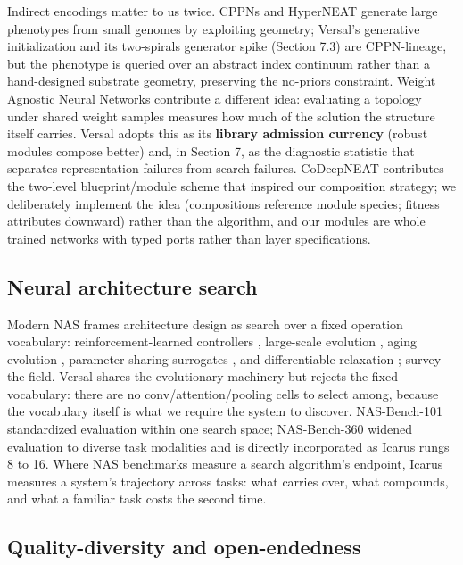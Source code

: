\documentclass[11pt]{article}
\begin{document}
Indirect encodings matter to us twice. CPPNs \citep{stanley2007} and HyperNEAT \citep{stanley2009, risi2012} generate large phenotypes from small genomes by exploiting geometry; Versal's generative initialization and its two-spirals generator spike (Section 7.3) are CPPN-lineage, but the phenotype is queried over an abstract index continuum rather than a hand-designed substrate geometry, preserving the no-priors constraint. Weight Agnostic Neural Networks \citep{gaier2019} contribute a different idea: evaluating a topology under shared weight samples measures how much of the solution the structure itself carries. Versal adopts this as its \textbf{library admission currency} (robust modules compose better) and, in Section 7, as the diagnostic statistic that separates representation failures from search failures. CoDeepNEAT \citep{miikkulainen2017} contributes the two-level blueprint/module scheme that inspired our composition strategy; we deliberately implement the idea (compositions reference module species; fitness attributes downward) rather than the algorithm, and our modules are whole trained networks with typed ports rather than layer specifications.

\subsection{Neural architecture search}

Modern NAS frames architecture design as search over a fixed operation vocabulary: reinforcement-learned controllers \citep{zoph2017}, large-scale evolution \citep{real2017}, aging evolution \citep{real2019}, parameter-sharing surrogates \citep{pham2018}, and differentiable relaxation \citep{liu2019}; \citet{elsken2019b} survey the field. Versal shares the evolutionary machinery but rejects the fixed vocabulary: there are no conv/attention/pooling cells to select among, because the vocabulary itself is what we require the system to discover. NAS-Bench-101 \citep{ying2019} standardized evaluation within one search space; NAS-Bench-360 \citep{tu2022} widened evaluation to diverse task modalities and is directly incorporated as Icarus rungs 8 to 16. Where NAS benchmarks measure a search algorithm's endpoint, Icarus measures a system's trajectory across tasks: what carries over, what compounds, and what a familiar task costs the second time.

\subsection{Quality-diversity and open-endedness}
\end{document}
